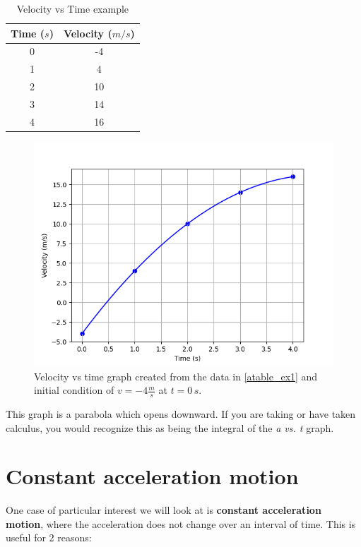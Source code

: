 \documentclass[12pt]{book}
\begin{document}
\begin{table}[h]
\large
\centering
\caption{Velocity vs Time example}
\begin{tabular}{| c | c |}
	\hline
	Time ($s$) & Velocity ($m/s$) \\
	\hline
	0 & -4 \\ \hline
	1 & 4 \\ \hline
	2 & 10 \\ \hline
	3 & 14 \\ \hline
	4 & 16 \\ 
	\hline
\end{tabular}
\label{vtable_ex1}
\end{table}



\begin{figure}[h]
\centering
\includegraphics[scale=0.6]{example_vel.png}
\caption{Velocity vs time graph created from the data in \ref{atable_ex1} and initial condition of $v = -4 \frac{m}{s}$ at $t = 0 \, s$.}
\end{figure}

This graph is a parabola which opens downward. If you are taking or have taken calculus, you would recognize this as being the integral of the \textit{a vs. t} graph. 

\linespace

\newpage

\section{Constant acceleration motion}

One case of particular interest we will look at is \textbf{constant acceleration motion}, where the acceleration does not change over an interval of time. This is useful for 2 reasons:
\end{document}
